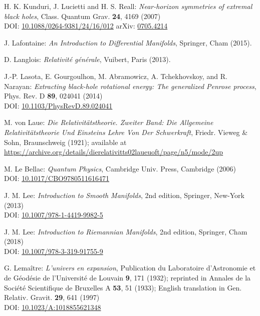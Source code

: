 \begin{thebibliography}{123}
H. K. Kunduri, J. Lucietti and H. S. Reall:
{\em Near-horizon symmetries of extremal black holes},
Class. Quantum Grav. {\bf 24}, 4169 (2007)\\
DOI: \href{https://doi.org/10.1088/0264-9381/24/16/012}{10.1088/0264-9381/24/16/012}\hfill
arXiv: \href{https://arxiv.org/abs/0705.4214}{0705.4214}

J. Lafontaine: {\em An Introduction to Differential Manifolds},
Springer, Cham (2015).

D. Langlois: \emph{Relativit\'e g\'en\'erale},
Vuibert, Paris (2013).

J.-P. Lasota, E. Gourgoulhon, M. Abramowicz, A. Tchekhovskoy,
and R. Narayan:
{\em Extracting black-hole rotational energy: The generalized Penrose process},
Phys. Rev. D {\bf 89}, 024041 (2014)  \\
DOI: \href{https://doi.org/10.1103/PhysRevD.89.024041}{10.1103/PhysRevD.89.024041}

M. von Laue: {\em Die Relativitätstheorie. Zweiter Band: Die Allgemeine Relativitätstheorie Und Einsteins Lehre Von Der Schwerkraft},
Friedr. Vieweg \& Sohn, Braunschweig (1921); available at \\
\url{https://archive.org/details/dierelativitts02laueuoft/page/n5/mode/2up}

M. Le Bellac:
{\em Quantum Physics},
Cambridge Univ. Press, Cambridge (2006)\\
DOI: \href{ https://doi.org/10.1017/CBO9780511616471}{10.1017/CBO9780511616471}

J. M. Lee: {\em Introduction to Smooth Manifolds}, 2nd edition,
Springer, New-York (2013)\\
DOI: \href{https://doi.org/10.1007/978-1-4419-9982-5}{10.1007/978-1-4419-9982-5}

J. M. Lee: {\em Introduction to Riemannian Manifolds}, 2nd edition,
Springer, Cham (2018)\\
DOI: \href{https://doi.org/10.1007/978-3-319-91755-9}{10.1007/978-3-319-91755-9}

G. Lemaître: {\em L'univers en expansion},
Publication du Laboratoire d'Astronomie et de Géodésie de l'Université
de Louvain {\bf 9},  171 (1932); reprinted in
Annales de la Société Scientifique de Bruxelles A {\bf 53}, 51 (1933);
English translation in
Gen. Relativ. Gravit. {\bf 29}, 641 (1997)\\
DOI: \href{https://doi.org/10.1023/A:1018855621348}{10.1023/A:1018855621348}


\end{thebibliography}
